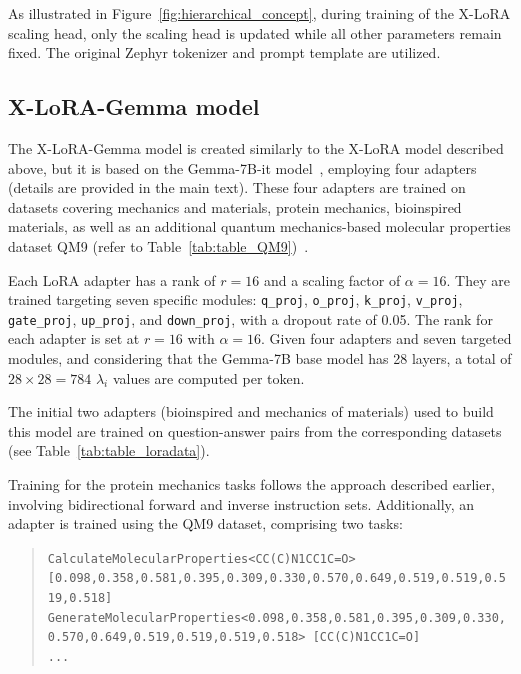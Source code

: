 As illustrated in Figure~\ref{fig:hierarchical_concept}, during training of the X-LoRA scaling head, only the scaling head is updated while all other parameters remain fixed. The original Zephyr tokenizer and prompt template are utilized.

\subsection{X-LoRA-Gemma model} The X-LoRA-Gemma model is created similarly to the X-LoRA model described above, but it is based on the Gemma-7B-it model~\cite{Google/gemma-7b-itFace}, employing four adapters (details are provided in the main text). These four adapters are trained on datasets covering mechanics and materials, protein mechanics, bioinspired materials, as well as an additional quantum mechanics-based molecular properties dataset QM9 (refer to Table~\ref{tab:table_QM9})~\cite{Ruddigkeit2012EnumerationGDB-17,Ramakrishnan2015ElectronicSpace}.

Each LoRA adapter has a rank of $r=16$ and a scaling factor of $\alpha=16$. They are trained targeting seven specific modules: \texttt{q\_proj}, \texttt{o\_proj}, \texttt{k\_proj}, \texttt{v\_proj}, \texttt{gate\_proj}, \texttt{up\_proj}, and \texttt{down\_proj}, with a dropout rate of 0.05. The rank for each adapter is set at $r=16$ with $\alpha=16$. Given four adapters and seven targeted modules, and considering that the Gemma-7B base model has 28 layers, a total of $28\times 28=784$ $\lambda_i$ values are computed per token.

The initial two adapters (bioinspired and mechanics of materials) used to build this model are trained on question-answer pairs from the corresponding datasets (see Table~\ref{tab:table_loradata}).

Training for the protein mechanics tasks follows the approach described earlier, involving bidirectional forward and inverse instruction sets. Additionally, an adapter is trained using the QM9 dataset, comprising two tasks:

\begin{quote}
\tiny {\texttt{CalculateMolecularProperties<CC(C)N1CC1C=O> [0.098,0.358,0.581,0.395,0.309,0.330,0.570,0.649,0.519,0.519,0.519,0.518]\\
GenerateMolecularProperties<0.098,0.358,0.581,0.395,0.309,0.330,0.570,0.649,0.519,0.519,0.519,0.518> [CC(C)N1CC1C=O]\\ 
...
}}
\end{quote}

